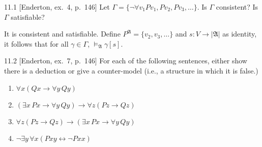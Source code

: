 
\begin{exercise}{11.1}
  [Enderton, ex.~4, p.~146]
  Let $\Gamma=\{\neg\forall v_1 P v_1, Pv_2, Pv_3,\dots\}.$ Is $\Gamma$ consistent? Is $\Gamma$ satisfiable?
\end{exercise}

It is consistent and satisfiable. Define $P^{\mathfrak{A}}=\{v_2,v_3,\dots\}$ and $s:V\rightarrow|\mathfrak{A}|$ as identity, it follows that for all $\gamma\in \Gamma$, $\vDash_{\mathfrak{A}}\gamma[s]$.

\begin{exercise}{11.2}
  [Enderton, ex.~7, p.~146]
  For each of the following sentences, either show there is a deduction or give a counter-model (i.e., a structure in which it is false.)
  \begin{enumerate}[label=(\alph*)]
    \item $\forall x (Qx \rightarrow \forall y \, Qy)$
    \item $(\exists x \, Px \rightarrow \forall y \, Qy) \rightarrow \forall z (Pz \rightarrow Qz)$
    \item $\forall z (Pz \rightarrow Qz) \rightarrow (\exists x \, Px \rightarrow \forall y \, Qy)$
    \item $\neg \exists y \, \forall x (Pxy \leftrightarrow \neg Pxx)$\qedhere
  \end{enumerate}
\end{exercise}

